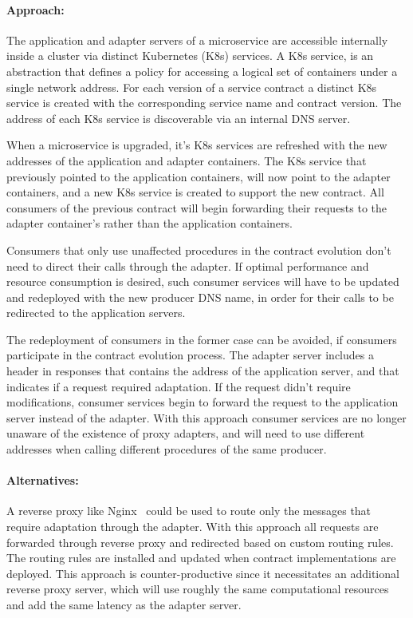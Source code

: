 \paragraph{Approach:}
The application and adapter servers of a microservice are accessible internally inside a cluster via distinct Kubernetes (K8s) services.
A K8s service, is an abstraction that defines a policy for accessing a logical set of containers under a single network address.
For each version of a service contract a distinct K8s service is created with the corresponding service name and contract version.
The address of each K8s service is discoverable via an internal DNS server.

When a microservice is upgraded, it's K8s services are refreshed with the new addresses of the application and adapter containers.
The K8s service that previously pointed to the application containers, will now point to the adapter containers, and
a new K8s service is created to support the new contract.
All consumers of the previous contract will begin forwarding their requests to the adapter container's rather than the application containers.

Consumers that only use unaffected procedures in the contract evolution don't need to direct their calls through the adapter.
If optimal performance and resource consumption is desired,
such consumer services will have to be updated and redeployed with the new producer DNS name, in order for their calls to be redirected to the application servers.

The redeployment of consumers in the former case can be avoided, if consumers participate in the contract evolution process.
The adapter server includes a header in responses that contains the address of the application server, and that indicates if a request required adaptation.
If the request didn't require modifications, consumer services begin to forward the request to the application server instead of the adapter.
With this approach consumer services are no longer unaware of the existence of proxy adapters,
and will need to use different addresses when calling different procedures of the same producer.

\paragraph{Alternatives:}
A reverse proxy like Nginx~\cite{nginx} could be used to route only the messages that require adaptation through the adapter.
With this approach all requests are forwarded through reverse proxy and redirected based on custom routing rules.
The routing rules are installed and updated when contract implementations are deployed.
This approach is counter-productive since it necessitates an additional reverse proxy server,
which will use roughly the same computational resources and add the same latency as the adapter server.

